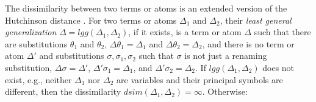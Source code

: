 \documentclass[EPiC]{easychair}
\begin{document}
The dissimilarity between two terms or atoms is an extended version of the
Hutchinson distance \cite{Hut97}.
For two terms or atoms $\Delta_1$ and $\Delta_2$, their \emph{least general 
generalization} $\Delta = lgg(\Delta_1,\Delta_2)$, if it exists, is a term 
or atom $\Delta$ such that there are substitutions $\theta_1$ and $\theta_2$, 
$\Delta\theta_1 = \Delta_1$ and $\Delta\theta_2 = \Delta_2$, and 
there is no term or atom $\Delta'$ and substitutions 
$\sigma, \sigma_1, \sigma_2$ such that 
$\sigma$ is not just a renaming substitution,
$\Delta\sigma = \Delta'$, $\Delta'\sigma_1 = \Delta_1$, 
and $\Delta'\sigma_2 = \Delta_2$.
If $lgg(\Delta_1,\Delta_2)$ does not exist, e.g., neither $\Delta_1$ nor
$\Delta_2$ are variables and their principal symbols are different, then the 
dissimilarity $dsim(\Delta_1,\Delta_2) = \infty$.
Otherwise:
\end{document}
